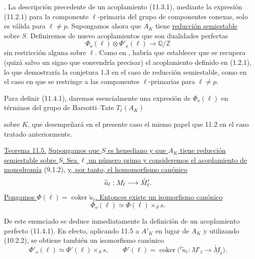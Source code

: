 \par\medskip
{}. La descripción precedente de un acoplamiento (11.3.1), mediante
la expresión (11.2.1) para la componente $\ell$-primaria del grupo de
componentes conexas, solo es válida para $\ell\ne p$. Supongamos ahora
que $A_K$ tiene \underline{reducción semiestable} sobre $S$.
Definiremos de nuevo acoplamientos que son dualidades perfectas
\begin{equation}\tag{11.4.1}
\Phi_o(\ell)\otimes\Phi'_o(\ell)\longrightarrow\mathbb Q/\mathbb Z
\end{equation}
sin restricción alguna sobre $\ell$. Como en
, habría que establecer que se recupera (quizá salvo
un signo que convendría precisar) el acoplamiento definido en (1.2.1),
lo que demostraría la conjetura 1.3 en el caso de reducción
semiestable, como en el caso en que se restringe a las componentes
$\ell$-primarias para $\ell\ne p$.

Para definir (11.4.1), daremos esencialmente una expresión de
$\Phi_o(\ell)$ en términos del grupo de Barsotti--Tate $T_\ell(A_K)$


sobre $K$, que desempeñará en el presente caso el mismo papel que 11.2
en el caso tratado anteriormente.

\medskip
\noindent
\underline{Teorema 11.5.} \underline{Supongamos que $S$ es henseliano
y que $A_K$ tiene reducción semiestable sobre $S$. Sea $\ell$ un número
primo y consideremos el acoplamiento de monodromía} (9.1.2),
\underline{y, por tanto, el homomorfismo canónico}
\begin{equation*}
\widetilde u_\ell\sisi{;}{:}\underline M_\ell
 \longrightarrow\underline{\check M}'_\ell.
\end{equation*}
\underline{Pongamos
$\Phi(\ell)=\operatorname{coker}\widetilde u_\ell$. Entonces existe un
isomorfismo canónico}
\begin{equation}\tag{11.5.1}
\Phi_o(\ell)\simeq\Phi(\ell)\times_S s.
\end{equation}

De este enunciado se deduce inmediatamente la definición de un
acoplamiento perfecto (11.4.1). En efecto, aplicando 11.5 a $A'_K$ en
lugar de $A_K$ y utilizando (10.2.2), se obtiene también un isomorfismo
canónico
\begin{equation*}
\Phi'_o(\ell)\simeq\Phi'(\ell)\times_S s,
\qquad
\Phi'(\ell)=\operatorname{coker}\bigl(
 {}^t\!\widetilde u_\ell:\underline M'_\ell
 \longrightarrow\underline{\check M}_\ell\bigr).
\end{equation*}

